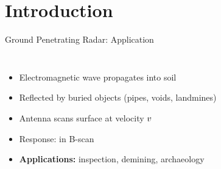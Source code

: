 
\section{Introduction}

\begin{frame}{Ground Penetrating Radar: Application}
  \begin{columns}[T]
      \vspace{0.5em}
      

      \vspace{0.5em}
      \begin{itemize}
        \item Electromagnetic wave propagates into soil
        \pause
        \item Reflected by buried objects (pipes, voids, landmines)
        \pause
        \item Antenna scans surface at velocity $v$
        \pause
        \item Response:  in B-scan
        \item[\textbullet] \textbf{Applications:} inspection, demining, archaeology
      \end{itemize}
  \end{columns}
\end{frame}

